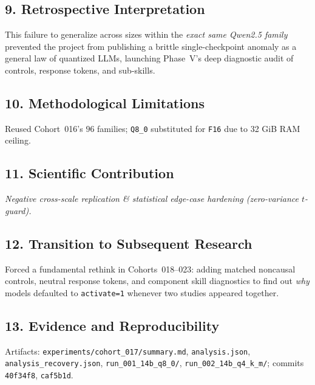 \subsection*{9. Retrospective Interpretation}
This failure to generalize across sizes within the \emph{exact same Qwen2.5 family} prevented the project from publishing a brittle single-checkpoint anomaly as a general law of quantized LLMs, launching Phase~V's deep diagnostic audit of controls, response tokens, and sub-skills.

\subsection*{10. Methodological Limitations}
Reused Cohort~016's $96$ families; \texttt{Q8\_0} substituted for \texttt{F16} due to 32 GiB RAM ceiling.

\subsection*{11. Scientific Contribution}
\emph{Negative cross-scale replication \& statistical edge-case hardening (zero-variance $t$-guard).}

\subsection*{12. Transition to Subsequent Research}
Forced a fundamental rethink in Cohorts~018--023: adding matched noncausal controls, neutral response tokens, and component skill diagnostics to find out \emph{why} models defaulted to \texttt{activate=1} whenever two studies appeared together.

\subsection*{13. Evidence and Reproducibility}
Artifacts: \texttt{experiments/cohort\_017/summary.md}, \texttt{analysis.json}, \texttt{analysis\_recovery.json}, \texttt{run\_001\_14b\_q8\_0/}, \texttt{run\_002\_14b\_q4\_k\_m/}; commits \texttt{40f34f8}, \texttt{caf5b1d}.

